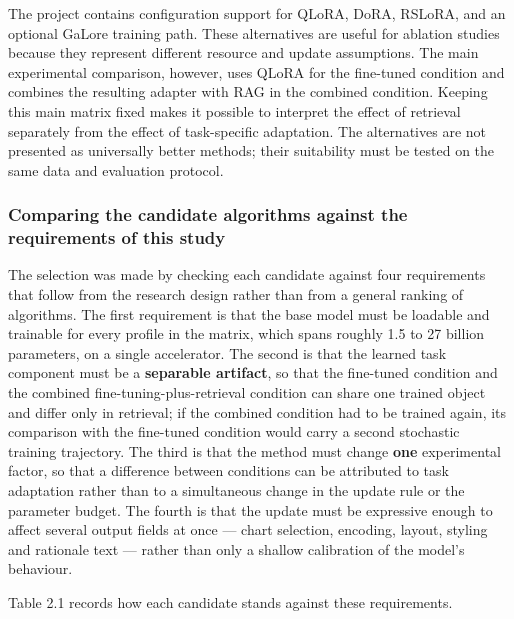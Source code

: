 The project contains configuration support for QLoRA, DoRA, RSLoRA, and an optional GaLore training path. These alternatives are useful for ablation studies because they represent different resource and update assumptions. The main experimental comparison, however, uses QLoRA for the fine-tuned condition and combines the resulting adapter with RAG in the combined condition. Keeping this main matrix fixed makes it possible to interpret the effect of retrieval separately from the effect of task-specific adaptation. The alternatives are not presented as universally better methods; their suitability must be tested on the same data and evaluation protocol.

\subsubsection{Comparing the candidate algorithms against the requirements of this study}

The selection was made by checking each candidate against four requirements that follow from the research design rather than from a general ranking of algorithms. The first requirement is that the base model must be loadable and trainable for every profile in the matrix, which spans roughly 1.5 to 27 billion parameters, on a single accelerator. The second is that the learned task component must be a \textbf{separable artifact}, so that the fine-tuned condition and the combined fine-tuning-plus-retrieval condition can share one trained object and differ only in retrieval; if the combined condition had to be trained again, its comparison with the fine-tuned condition would carry a second stochastic training trajectory. The third is that the method must change \textbf{one} experimental factor, so that a difference between conditions can be attributed to task adaptation rather than to a simultaneous change in the update rule or the parameter budget. The fourth is that the update must be expressive enough to affect several output fields at once --- chart selection, encoding, layout, styling and rationale text --- rather than only a shallow calibration of the model's behaviour.

Table 2.1 records how each candidate stands against these requirements.

